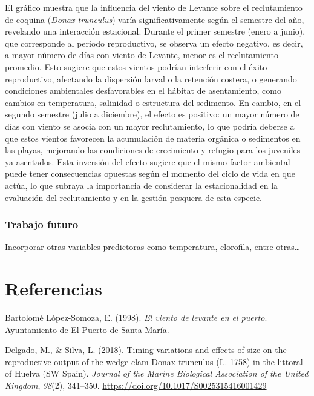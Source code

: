 \documentclass[
]{article}
\newlength{\cslhangindent}
\newenvironment{CSLReferences}[2] %
 {\begin{list}{}{%
  \setlength{\itemindent}{0pt}
  \setlength{\leftmargin}{0pt}
  \setlength{\parsep}{0pt}
  \ifodd #1
   \setlength{\leftmargin}{\cslhangindent}
   \setlength{\itemindent}{-1\cslhangindent}
  \fi
  \setlength{\itemsep}{#2\baselineskip}}}
 {\end{list}}
\begin{document}
El gráfico muestra que la influencia del viento de Levante sobre el reclutamiento de coquina (\emph{Donax trunculus}) varía significativamente según el semestre del año, revelando una interacción estacional. Durante el primer semestre (enero a junio), que corresponde al periodo reproductivo, se observa un efecto negativo, es decir, a mayor número de días con viento de Levante, menor es el reclutamiento promedio. Esto sugiere que estos vientos podrían interferir con el éxito reproductivo, afectando la dispersión larval o la retención costera, o generando condiciones ambientales desfavorables en el hábitat de asentamiento, como cambios en temperatura, salinidad o estructura del sedimento. En cambio, en el segundo semestre (julio a diciembre), el efecto es positivo: un mayor número de días con viento se asocia con un mayor reclutamiento, lo que podría deberse a que estos vientos favorecen la acumulación de materia orgánica o sedimentos en las playas, mejorando las condiciones de crecimiento y refugio para los juveniles ya asentados. Esta inversión del efecto sugiere que el mismo factor ambiental puede tener consecuencias opuestas según el momento del ciclo de vida en que actúa, lo que subraya la importancia de considerar la estacionalidad en la evaluación del reclutamiento y en la gestión pesquera de esta especie.

\subsubsection{Trabajo futuro}\label{trabajo-futuro}

Incorporar otras variables predictoras como temperatura, clorofila, entre otras\ldots{}

\newpage

\section*{Referencias}\label{referencias}

\label{refs}
\begin{CSLReferences}{1}{0}
Bartolomé López-Somoza, E. (1998). \emph{El viento de levante en el puerto}. Ayuntamiento de El Puerto de Santa María.

Delgado, M., \& Silva, L. (2018). {Timing variations and effects of size on the reproductive output of the wedge clam Donax trunculus (L. 1758) in the littoral of Huelva (SW Spain)}. \emph{Journal of the Marine Biological Association of the United Kingdom}, \emph{98}(2), 341--350. \url{https://doi.org/10.1017/S0025315416001429}

\end{CSLReferences}
\end{document}
